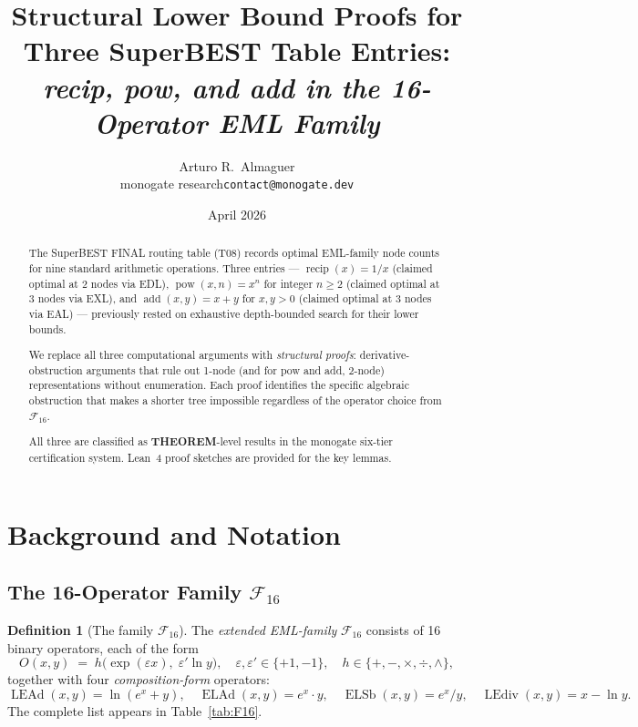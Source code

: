 \documentclass[12pt,a4paper]{article}
\title{Structural Lower Bound Proofs for Three SuperBEST Table Entries:\\
       \large\textit{recip, pow, and add in the 16-Operator EML Family}}
\author{Arturo R.\ Almaguer\\
  \small monogate research\quad\texttt{contact@monogate.dev}}
\date{April 2026}
\theoremstyle{definition}
\newtheorem{definition}[theorem]{Definition}
\newcommand{\ELAd}{\operatorname{ELAd}}
\newcommand{\ELSb}{\operatorname{ELSb}}
\newcommand{\LEAd}{\operatorname{LEAd}}
\newcommand{\LEdiv}{\operatorname{LEdiv}}
\newcommand{\F}{\mathcal{F}_{16}}
\newcommand{\recip}{\operatorname{recip}}
\newcommand{\pow}{\operatorname{pow}}
\newcommand{\add}{\operatorname{add}}
\begin{document}
\maketitle

\begin{abstract}
The SuperBEST FINAL routing table (T08) records optimal EML-family node counts
for nine standard arithmetic operations.  Three entries --- $\recip(x)=1/x$
(claimed optimal at 2 nodes via EDL), $\pow(x,n)=x^n$ for integer $n\geq 2$
(claimed optimal at 3 nodes via EXL), and $\add(x,y)=x+y$ for $x,y>0$ (claimed
optimal at 3 nodes via EAL) --- previously rested on exhaustive depth-bounded
search for their lower bounds.

We replace all three computational arguments with \emph{structural proofs}:
derivative-obstruction arguments that rule out 1-node (and for pow and add,
2-node) representations without enumeration.  Each proof identifies the
specific algebraic obstruction that makes a shorter tree impossible regardless
of the operator choice from $\F$.

All three are classified as \textbf{THEOREM}-level results in the monogate
six-tier certification system.  Lean~4 proof sketches are provided for the
key lemmas.
\end{abstract}

\tableofcontents
\bigskip

\section{Background and Notation}
\label{sec:background}

\subsection{The 16-Operator Family \texorpdfstring{$\mathcal{F}_{16}$}{F16}}

\begin{definition}[The family $\F$]\label{def:F16}
The \emph{extended EML-family} $\F$ consists of 16 binary operators,
each of the form
\[
  O(x,y) \;=\; h\!\bigl(\exp(\varepsilon x),\; \varepsilon'\ln y\bigr),
  \quad \varepsilon,\varepsilon'\in\{+1,-1\},\quad
  h \in \{+,-,\times,\div,\wedge\},
\]
together with four \emph{composition-form} operators:
\[
  \LEAd(x,y) = \ln(e^x + y),\quad
  \ELAd(x,y) = e^x \cdot y,\quad
  \ELSb(x,y) = e^x / y,\quad
  \LEdiv(x,y) = x - \ln y.
\]
The complete list appears in Table~\ref{tab:F16}.
\end{definition}
\end{document}
